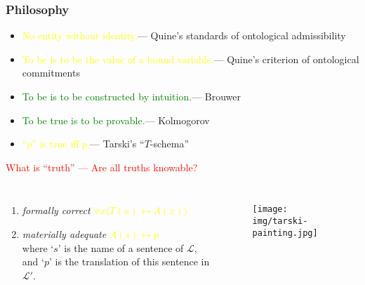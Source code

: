 \documentclass[UTF8,aspectratio=43,11pt,colorlinks,compress,openany]{beamer}%
\begin{document}
\begin{frame}\frametitle{Philosophy}
	\begin{itemize}
		\item \textcolor{yellow}{No entity without identity.}\hfill --- Quine's standards of ontological admissibility
		\item \textcolor{yellow}{To be is to be the value of a bound variable.}\hfill --- Quine's criterion of ontological commitments
		\item \textcolor{green}{To be is to be constructed by intuition.}\hfill --- Brouwer
		\item \textcolor{green}{To be true is to be provable.}\hfill --- Kolmogorov
		\item \textcolor{yellow}{``$p$'' is true iff $p$.}\hfill --- Tarski's ``$T$-schema''
	\end{itemize}
			\begin{block}{}
				\centering\textcolor{red}{What is ``truth'' --- Are all truths knowable?}
			\end{block}\vspace{-2ex}
	\begin{columns}
			\begin{enumerate}
				\item \emph{formally correct} \textcolor{yellow}{$\forall x\big(T(x)\leftrightarrow A(x)\big)$}
				\item \emph{materially adequate} \textcolor{yellow}{$A(s)\leftrightarrow p$}\\
				where `$s$' is the name of a sentence of $\mathscr{L}$, and `$p$' is the translation of this sentence
				in $\mathscr{L}'$.
			\end{enumerate}
			\begin{figure}
				\texttt{[image: img/tarski-painting.jpg]}
			\end{figure}
	\end{columns}
\end{frame}
\end{document}
